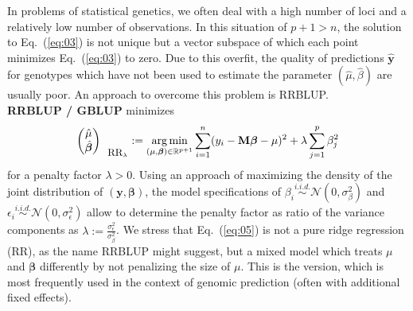\documentclass{bmcart}
\newcommand{\bb}{\bm{\beta}}
\DeclareMathOperator*{\argmin}{arg\,min}
\newcommand{\M}{\mathbf{M}}
\newcommand{\0}{\mathbf{0}}
\begin{document}
In problems of statistical genetics, we often deal with a high number of loci and a relatively low number of observations.
In this situation of $p + 1 > n$, the solution to Eq.~(\ref{eq:03}) is not unique but a vector subspace of which each point minimizes Eq.~(\ref{eq:03}) to zero.
Due to this overfit, the quality of predictions $\hat{\mathbf{y}}$ for genotypes which have not been used to estimate the parameter $(\hat{\mu},\hat{\beta})$ are usually poor. An approach to overcome this problem is RRBLUP.
\vspace{0.4cm}\\
{\bf RRBLUP / GBLUP} minimizes 
\begin{equation}\label{eq:05}
	\begin{pmatrix}
		\hat{\mu} \\
		\hat{\bm{\beta}}
	\end{pmatrix}_{\mbox{\small RR}_\lambda} :=\argmin_{(\mu,\bm{\beta}) \in \mathbb{R}^{p+1}} \sum\limits_{i=1}^n (y_i - \M\bm{\beta} - \mu)^2  + \lambda \sum\limits_{j=1}^p {\beta}_j^2
\end{equation}
for a penalty factor $\lambda > 0$. Using an approach of maximizing the density of the joint distribution of $(\mathbf{y},\bm{\beta})$, the model specifications of ${\beta_i}\stackrel{i.i.d.}{\sim} \mathcal{N}(0,\sigma_\beta^2)$ and ${\epsilon_i}\stackrel{i.i.d.}{\sim} \mathcal{N}(0,\sigma_\epsilon^2)$ allow to determine the penalty factor as ratio of the variance components  as $\lambda := \frac{\sigma_\epsilon^2}{\sigma_\beta^2}$. We stress that Eq.~(\ref{eq:05}) is not a pure ridge regression (RR), as the name RRBLUP might suggest, but a mixed model which treats $\mu$ and $\bb$ differently by not penalizing the size of $\mu$. This is the version, which is most frequently used in the context of genomic prediction (often with additional fixed effects). \\
\end{document}
